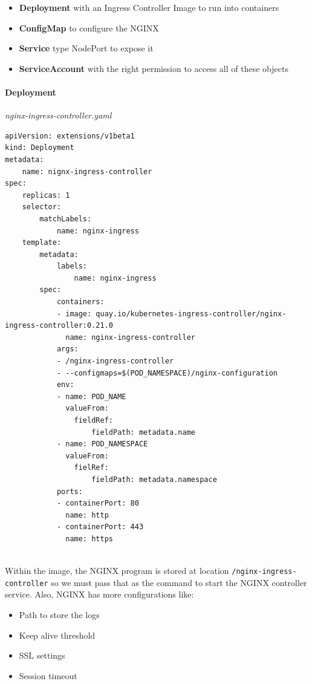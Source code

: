 \documentclass{article}
\newenvironment{codetemplate}[1][]{%
  \mybasecolorbox[#1]
  \itshape
}{%
  \endmybasecolorbox
}
\begin{document}
\begin{itemize}
    \item \textbf{Deployment} with an Ingress Controller Image to run into containers
    \item \textbf{ConfigMap} to configure the NGINX
    \item \textbf{Service} type NodePort to expose it
    \item \textbf{ServiceAccount} with the right permission to access all of these objects
\end{itemize}

\paragraph{Deployment}

\begin{codetemplate}{nginx-ingress-controller.yaml}
\begin{verbatim}
apiVersion: extensions/v1beta1
kind: Deployment
metadata:
    name: nignx-ingress-controller
spec:
    replicas: 1
    selector:
        matchLabels:
            name: nginx-ingress
    template:
        metadata:
            labels:
                name: nginx-ingress
        spec:
            containers:
            - image: quay.io/kubernetes-ingress-controller/nginx-ingress-controller:0.21.0
              name: nginx-ingress-controller
            args:
            - /nginx-ingress-controller
            - --configmaps=$(POD_NAMESPACE)/nginx-configuration
            env:
            - name: POD_NAME
              valueFrom:
                fieldRef:
                    fieldPath: metadata.name
            - name: POD_NAMESPACE
              valueFrom:
                fielRef:
                    fieldPath: metadata.namespace
            ports:
            - containerPort: 80
              name: http
            - containerPort: 443
              name: https
            
\end{verbatim}
\end{codetemplate}

Within the image, the NGINX program is stored at location \verb|/nginx-ingress-controller| so we must pass that as the command to start the NGINX controller service. Also, NGINX has more configurations like:
\begin{itemize}
    \item Path to store the logs
    \item Keep alive threshold
    \item SSL settings
    \item Session timeout
\end{itemize}
\end{document}
